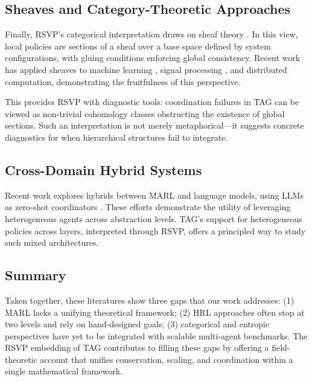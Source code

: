 \documentclass[11pt,a4paper]{article}
\begin{document}
\subsection{Sheaves and Category-Theoretic Approaches}

Finally, RSVP’s categorical interpretation draws on sheaf theory
\citep{maclane1992sheaves,bredon1997sheaf}. In this view, local policies are
sections of a sheaf over a base space defined by system configurations, with
gluing conditions enforcing global consistency. Recent work has applied sheaves
to machine learning \citep{curry2021sheaflearning}, signal processing
\citep{robinson2021topological}, and distributed computation, demonstrating the
fruitfulness of this perspective.

This provides RSVP with diagnostic tools: coordination failures in TAG can be
viewed as non-trivial cohomology classes obstructing the existence of global
sections. Such an interpretation is not merely metaphorical—it suggests
concrete diagnostics for when hierarchical structures fail to integrate.

\subsection{Cross-Domain Hybrid Systems}

Recent work explores hybrids between MARL and language models, using LLMs as
zero-shot coordinators \citep{wang2023llm_marl}. These efforts demonstrate the
utility of leveraging heterogeneous agents across abstraction levels. TAG’s
support for heterogeneous policies across layers, interpreted through RSVP,
offers a principled way to study such mixed architectures.

\subsection{Summary}

Taken together, these literatures show three gaps that our work addresses:
(1) MARL lacks a unifying theoretical framework; (2) HRL approaches often stop
at two levels and rely on hand-designed goals; (3) categorical and entropic
perspectives have yet to be integrated with scalable multi-agent benchmarks.
The RSVP embedding of TAG contributes to filling these gaps by offering a
field-theoretic account that unifies conservation, scaling, and coordination
within a single mathematical framework.
\end{document}
